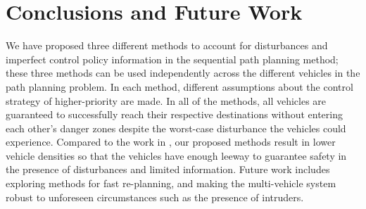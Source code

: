 \section{Conclusions and Future Work}
We have proposed three different methods to account for disturbances and imperfect control policy information in the sequential path planning method; these three methods can be used independently across the different vehicles in the path planning problem. In each method, different assumptions about the control strategy of higher-priority are made. In all of the methods, all vehicles are guaranteed to successfully reach their respective destinations without entering each other's danger zones despite the worst-case disturbance the vehicles could experience. Compared to the work in \cite{Chen15}, our proposed methods result in lower vehicle densities so that the vehicles have enough leeway to guarantee safety in the presence of disturbances and limited information. Future work includes exploring methods for fast re-planning, and making the multi-vehicle system robust to unforeseen circumstances such as the presence of intruders.